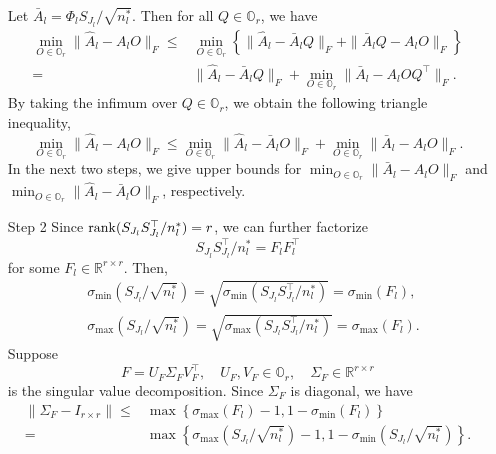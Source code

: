 \documentclass[11pt]{article}
\newcommand{\0}{{\mathbf{0}}}
\newcommand{\1}{{\mathbf{1}}}
\newcommand{\rank}{{\rm rank}}
\begin{document}
\begin{enumerate}[leftmargin=*]
	Let $\bar{A}_l = \Phi_l S_{J_l}/\sqrt{n_l^\ast}$. Then for all $Q \in \mathbb{O}_r$, we have
	\begin{equation*}
	\begin{split}
	\min_{O\in \mathbb{O}_r} \|\hat{A}_l - A_l O\|_F \leq & \min_{O\in \mathbb{O}_r} \left\{\|\hat{A}_l - \bar{A}_lQ\|_F + \|\bar{A}_lQ - A_lO\|_F\right\}\\
	= & \|\hat{A}_l - \bar{A}_lQ\|_F + \min_{O\in \mathbb{O}_r}\|\bar{A}_l - A_lOQ^\top\|_F. 
	\end{split}
	\end{equation*}
	By taking the infimum over $Q \in \mathbb{O}_r$, we obtain the following triangle inequality,
	\begin{equation}\label{ineq:triangle}
	\min_{O\in \mathbb{O}_r} \|\hat{A}_l - A_l O\|_F \leq \min_{O\in \mathbb{O}_r}\|\hat{A}_l - \bar{A}_lO\|_F + \min_{O\in \mathbb{O}_r}\|\bar{A}_l - A_lO\|_F.
	\end{equation}
	In the next two steps, we give upper bounds for $\min_{O\in \mathbb{O}_r} \|\bar{A}_l - A_l O\|_F$ and $\min_{O\in \mathbb{O}_r} \|\hat{A}_l - \bar{A}_l O\|_F$, respectively.
	\item[Step 2] Since $\rank(S_{J_l}S_{J_l}^\top/n_l^\ast) = r$, we can further factorize 
	$$S_{J_l}S_{J_l}^\top/n_l^\ast = F_lF_l^\top$$ 
	for some $F_l\in \mathbb{R}^{r\times r}$. Then,
	\begin{equation*}
	\begin{split}
	& \sigma_{\min}\left(S_{J_l}/\sqrt{n_l^\ast}\right) = \sqrt{\sigma_{\min}\left(S_{J_l}S_{J_l}^\top/n_l^\ast\right)} = \sigma_{\min}(F_l),\\
	&  \sigma_{\max}\left(S_{J_l}/\sqrt{n_l^\ast}\right) = \sqrt{\sigma_{\max}\left(S_{J_l}S_{J_l}^\top/n_l^\ast\right)} = \sigma_{\max}(F_l).
	\end{split}
	\end{equation*} 
	Suppose $$F = U_F\Sigma_F V_F^\top, \quad U_F, V_F\in \mathbb{O}_r, \quad \Sigma_F\in \mathbb{R}^{r\times r}$$ 
	is the singular value decomposition. Since $\Sigma_F$ is diagonal, we have
	\begin{equation}\label{ineq:Sigma_F-I}
	\begin{split}
	\|\Sigma_F - I_{r\times r}\| \leq & \max\left\{\sigma_{\max}(F_l) - 1, 1 - \sigma_{\min}(F_l)\right\}\\
	= & \max\left\{\sigma_{\max}(S_{J_l}/\sqrt{n_l^\ast}) - 1, 1 - \sigma_{\min}(S_{J_l}/\sqrt{n_l^\ast})\right\}.
	\end{split}
	\end{equation} 

\end{enumerate}
\end{document}
